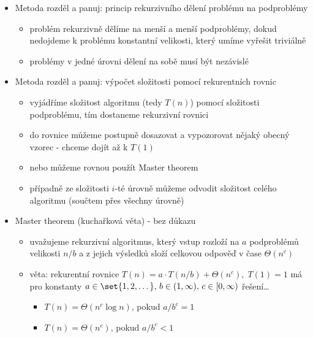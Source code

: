 \begin{itemize}
\begin{itemize}
\begin{itemize}
\begin{itemize}
\item pořídíme si tabulku (pomocí jiných proměnných $y_{ij}$)
\item vynutíme, aby v každém sloupci byla maximálně jedna jednička a v každém řádku právě jedna jednička
\end{itemize}
\item propojíme proměnné $x_j$ a $y_{ij}$ pomocí implikace $y_{ij}\to x_j$
\end{itemize}
\end{itemize}
\item Metoda rozděl a panuj: princip rekurzivního dělení problému na podproblémy
\begin{itemize}
\item problém rekurzivně dělíme na menší a menší podproblémy, dokud nedojdeme k problému konstantní velikosti, který umíme vyřešit triviálně
\item problémy v jedné úrovni dělení na sobě musí být nezávislé
\end{itemize}
\item Metoda rozděl a panuj: výpočet složitosti pomocí rekurentních rovnic
\begin{itemize}
\item vyjádříme složitost algoritmu (tedy $T(n)$) pomocí složitosti podproblému, tím dostaneme rekurzivní rovnici
\item do rovnice můžeme postupně dosazovat a vypozorovat nějaký obecný vzorec - chceme dojít až k $T(1)$
\item nebo můžeme rovnou použít Master theorem
\item případně ze složitosti $i$-té úrovně můžeme odvodit složitost celého algoritmu (součtem přes všechny úrovně)
\end{itemize}
\item Master theorem (kuchařková věta) - bez důkazu
\begin{itemize}
\item uvažujeme rekurzivní algoritmus, který vstup rozloží na $a$ podproblémů velikosti $n/b$ a z jejich výsledků složí celkovou odpověď v čase $\Theta(n^c)$
\item věta: rekurentní rovnice $T(n)=a\cdot T(n/b)+\Theta(n^c),\;T(1)=1$ má pro konstanty $a\in\set{1,2,\dots},\,b\in(1,\infty),\,c\in[0,\infty)$ řešení\dots{}
\begin{itemize}
\item $T(n)=\Theta(n^c\log n)$, pokud $a/b^c=1$
\item $T(n)=\Theta(n^c)$, pokud $a/b^c\lt 1$

\end{itemize}
\end{itemize}
\end{itemize}
